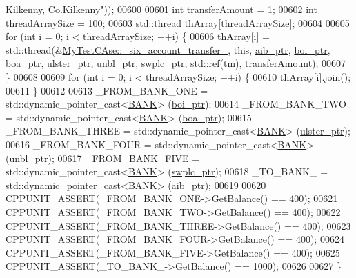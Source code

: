 \begin{DoxyCode}
{       Kilkenny, Co.Kilkenny"}));
00600     
00601     \textcolor{keywordtype}{int} transferAmount = 1;
00602     \textcolor{keywordtype}{int} threadArraySize = 100; 
00603     std::thread thArray[threadArraySize];
00604 
00605     \textcolor{keywordflow}{for} (\textcolor{keywordtype}{int} i = 0; i < threadArraySize; ++i) \{
00606         thArray[i] = std::thread(&\hyperlink{class_my_test_c_ase_a72ce436fb3c78c3d76b6c48a5a2e6a76_a72ce436fb3c78c3d76b6c48a5a2e6a76}{MyTestCAse::\_six\_account\_transfer\_}, \textcolor{keyword}{
      this}, \hyperlink{class_my_test_c_ase_adad50e8278b64aa0321000b528e5362c_adad50e8278b64aa0321000b528e5362c}{aib\_ptr}, \hyperlink{class_my_test_c_ase_a5554de9e3e6393a89c66c036c529720b_a5554de9e3e6393a89c66c036c529720b}{boi\_ptr}, \hyperlink{class_my_test_c_ase_ae0b2db5d35e25b3139beeda0705494f0_ae0b2db5d35e25b3139beeda0705494f0}{boa\_ptr}, \hyperlink{class_my_test_c_ase_a4f9f72374d3d15be7cdf16412c4d7ed3_a4f9f72374d3d15be7cdf16412c4d7ed3}{ulster\_ptr}, \hyperlink{class_my_test_c_ase_a0ca634b597d6c0e136d632268853d5a7_a0ca634b597d6c0e136d632268853d5a7}{unbl\_ptr}, 
      \hyperlink{class_my_test_c_ase_aa8ccae9a5a7feb5bc47591c55a82d0cd_aa8ccae9a5a7feb5bc47591c55a82d0cd}{swplc\_ptr}, std::ref(\hyperlink{class_my_test_c_ase_a422e6e5d4ddedea384be96031c89b72b_a422e6e5d4ddedea384be96031c89b72b}{tm}), transferAmount);
00607     \}
00608     
00609     \textcolor{keywordflow}{for} (\textcolor{keywordtype}{int} i = 0; i < threadArraySize; ++i) \{
00610         thArray[i].join();
00611     \}
00612     
00613     \_FROM\_BANK\_ONE = std::dynamic\_pointer\_cast<\hyperlink{class_b_a_n_k}{BANK}> (\hyperlink{class_my_test_c_ase_a5554de9e3e6393a89c66c036c529720b_a5554de9e3e6393a89c66c036c529720b}{boi\_ptr});
00614     \_FROM\_BANK\_TWO = std::dynamic\_pointer\_cast<\hyperlink{class_b_a_n_k}{BANK}> (\hyperlink{class_my_test_c_ase_ae0b2db5d35e25b3139beeda0705494f0_ae0b2db5d35e25b3139beeda0705494f0}{boa\_ptr});
00615     \_FROM\_BANK\_THREE = std::dynamic\_pointer\_cast<\hyperlink{class_b_a_n_k}{BANK}> (\hyperlink{class_my_test_c_ase_a4f9f72374d3d15be7cdf16412c4d7ed3_a4f9f72374d3d15be7cdf16412c4d7ed3}{ulster\_ptr});
00616     \_FROM\_BANK\_FOUR = std::dynamic\_pointer\_cast<\hyperlink{class_b_a_n_k}{BANK}> (\hyperlink{class_my_test_c_ase_a0ca634b597d6c0e136d632268853d5a7_a0ca634b597d6c0e136d632268853d5a7}{unbl\_ptr});
00617     \_FROM\_BANK\_FIVE = std::dynamic\_pointer\_cast<\hyperlink{class_b_a_n_k}{BANK}> (\hyperlink{class_my_test_c_ase_aa8ccae9a5a7feb5bc47591c55a82d0cd_aa8ccae9a5a7feb5bc47591c55a82d0cd}{swplc\_ptr});
00618     \_TO\_BANK\_ = std::dynamic\_pointer\_cast<\hyperlink{class_b_a_n_k}{BANK}> (\hyperlink{class_my_test_c_ase_adad50e8278b64aa0321000b528e5362c_adad50e8278b64aa0321000b528e5362c}{aib\_ptr});
00619     
00620     CPPUNIT\_ASSERT(\_FROM\_BANK\_ONE->GetBalance() == 400);
00621     CPPUNIT\_ASSERT(\_FROM\_BANK\_TWO->GetBalance() == 400);
00622     CPPUNIT\_ASSERT(\_FROM\_BANK\_THREE->GetBalance() == 400);
00623     CPPUNIT\_ASSERT(\_FROM\_BANK\_FOUR->GetBalance() == 400);
00624     CPPUNIT\_ASSERT(\_FROM\_BANK\_FIVE->GetBalance() == 400);
00625     CPPUNIT\_ASSERT(\_TO\_BANK\_->GetBalance() == 1000);
00626     
00627 \}
\end{DoxyCode}


